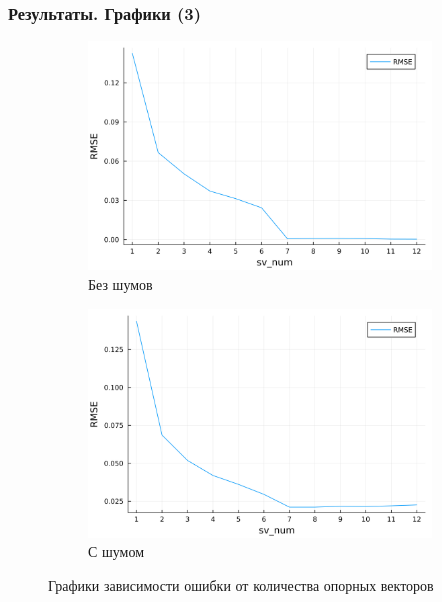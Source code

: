 \documentclass{beamer}
\begin{document}
\begin{frame}
	\frametitle{Результаты. Графики (3)}
	\begin{figure}
		\centering
		\begin{subfigure}{0.4\textwidth}
			\includegraphics[width=\linewidth]{../RMSE.png}
			\caption{Без шумов}
		\end{subfigure}
		\begin{subfigure}{0.4\textwidth}
			\includegraphics[width=\linewidth]{../RMSE_noise.png}
			\caption{С шумом}
		\end{subfigure}
		\caption{Графики зависимости ошибки от количества опорных векторов}
	\end{figure}
\end{frame}
\end{document}
